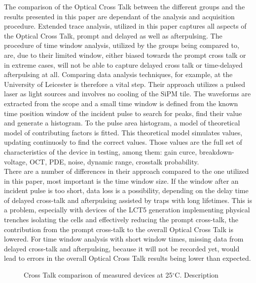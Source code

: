 \documentclass[12pt,article,type=msc,colorback,accentcolor=tud9c]{tudthesis}
\begin{document}
The comparison of the Optical Cross Talk between the different groups and the results presented in this paper are dependant of the analysis and acquisition procedure. Extended trace analysis, utilized in this paper captures all aspects of the Optical Cross Talk, prompt and delayed as well as afterpulsing. The procedure of time window analysis, utilized by the groups being compared to, are, due to their limited window, either biased towards the prompt cross talk or in extreme cases, will not be able to capture delayed cross talk or time-delayed afterpulsing at all. Comparing data analysis techniques, for example, at the University of Leicester is therefore a vital step. Their approach utilizes a pulsed laser as light sources and involves no cooling of the SiPM tile. The waveforms are extracted from the scope and a small time window is defined from the known time position window of the incident pulse to search for peaks, find their value and generate a histogram. To the pulse area histogram, a model of theoretical model of contributing factors is fitted. This theoretical model simulates values, updating continuosly to find the correct values. Those values are the full set of characteristics of the device in testing, among them: gain curce, breakdown-voltage, OCT, PDE, noise, dynamic range, crosstalk probability.\\
There are a number of differences in their approach compared to the one utilized in this paper, most important is the time window size. If the window after an incident pulse is too short, data loss is a possibility, depending on the delay time of delayed cross-talk and afterpulsing assisted by traps with long lifetimes. This is a problem, especially with devices of the LCT5 generation implementing physical trenches isolating the cells and effectively reducing the prompt cross-talk, the contribution from the prompt cross-talk to the overall Optical Cross Talk is lowered. For time window analysis with short window times, missing data from delayed cross-talk and afterpulsing, because it will not be recorded yet, would lead to errors in the overall Optical Cross Talk results being lower than expected.\\



\begin{figure}[h]
\begin{centering}
\caption{Cross Talk comparison of measured devices at 25$^\circ$C. Description}
\label{fig:DC_OCT}
\end{centering}
\end{figure}
\end{document}
